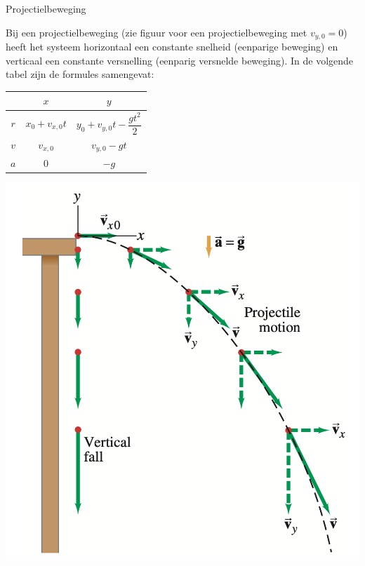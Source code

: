 \begin{app}[Projectielbeweging]{Projectielbeweging}

    Bij een projectielbeweging (zie figuur voor een projectielbeweging met $ v_{y,0} = 0 $) heeft het systeem horizontaal een constante snelheid (eenparige beweging) en verticaal een constante versnelling (eenparig versnelde beweging). In de volgende tabel zijn de formules samengevat: 
            
    \begin{minipage}{.43\textwidth}
    
        \def\arraystretch{2.5}
        \hspace{2cm}\begin{tabular}{c|c|c}
             & $x$ & $y$ \\ \hline
             $ r $ & $ x_0 + v_{x,0}t $ & $ y_0 + v_{y,0}t - \dfrac{gt^2}{2} $ \\ \hline
             $ v $ & $ v_{x,0} $ & $ v_{y,0} - gt $  \\ \hline
             $ a $ & $ 0 $ & $ -g $ 
        \end{tabular}
        
    \end{minipage} 
    \begin{minipage}{.43\textwidth}
        \hspace{3cm}\includegraphics[scale = 0.25]{Images/Kinematica/Projectielbeweging.png}
    \end{minipage}
        

\end{app}
